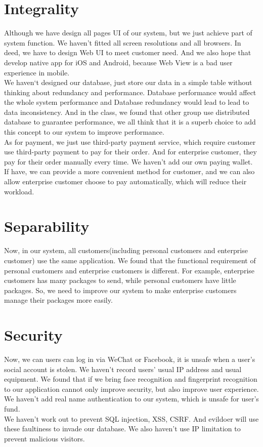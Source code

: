\documentclass[12pt]{scrreprt}
\begin{document}
\section{Integrality}
Although we have design all pages UI of our system, but we just achieve part of system function. We haven't fitted all screen resolutions and all browsers. In deed, we have to design Web UI to meet customer need. And we also hope that develop native app for iOS and Android, because Web View is a bad user experience in mobile.\\
We haven‘t designed our database, just store our data in a simple table without thinking about redundancy and performance. Database performance would affect the whole system performance and Database redundancy would lead to lead to data inconsistency. And in the class, we found that other group use distributed database to guarantee performance, we all think that it is a superb choice to add this concept to our system to improve performance.\\
As for payment, we just use third-party payment service, which require customer use third-party payment to pay for their order. And for enterprise customer, they pay for their order manually every time. We haven't add our own paying wallet. If have, we can provide a more convenient method for customer, and we can also allow enterprise customer choose to pay automatically, which will reduce their workload.
\section{Separability}
Now, in our system, all customers(including personal customers and enterprise customer) use the same application. We found that the functional requirement of personal customers and enterprise customers is different. For example, enterprise customers has many packages to send, while personal customers have little packages. So, we need to improve our system to make enterprise customers manage their packages more easily.
\section{Security}
Now, we can users can log in via WeChat or Facebook, it is unsafe when a user's social account is stolen. We haven't record users' usual IP address and usual equipment. We found that if we bring face recognition and fingerprint recognition to our application cannot only improve security, but also improve user experience. We haven't add real name authentication to our system, which is unsafe for user's fund.\\
We haven't work out to prevent SQL injection, XSS, CSRF. And evildoer will use these faultiness to invade our database. We also haven't use IP limitation to prevent malicious visitors.
\end{document}
